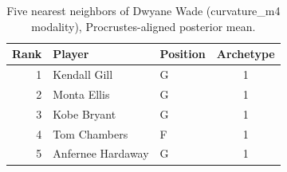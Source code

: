 \begin{table}[htbp]
  \centering\small
  \begin{tabular}{rllc}
    \toprule
    Rank & Player & Position & Archetype \\
    \midrule
    1 & Kendall Gill & G & 1 \\
    2 & Monta Ellis & G & 1 \\
    3 & Kobe Bryant & G & 1 \\
    4 & Tom Chambers & F & 1 \\
    5 & Anfernee Hardaway & G & 1 \\
    \bottomrule
  \end{tabular}
  \caption{Five nearest neighbors of Dwyane Wade (curvature_m4 modality), Procrustes-aligned posterior mean.}
  \label{tab:Dwyane_Wade_neighbors_curvature_m4}
\end{table}

